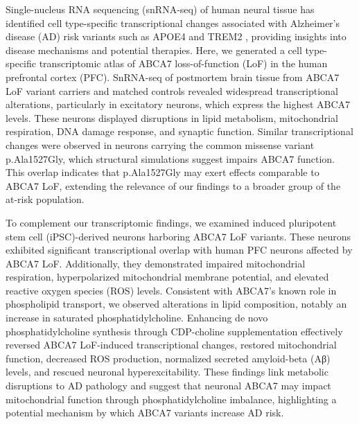 Single-nucleus RNA sequencing (snRNA-seq) of human neural tissue has identified cell type-specific transcriptional changes associated with Alzheimer's disease (AD) risk variants such as APOE4 and TREM2 \cite{Brase2023-xk,Blanchard2022-cf,Sayed2021-qn,Wamsley2024-zm,Kamath2022-if}, providing insights into disease mechanisms and potential therapies. Here, we generated a cell type-specific transcriptomic atlas of ABCA7 loss-of-function (LoF) in the human prefrontal cortex (PFC). SnRNA-seq of postmortem brain tissue from ABCA7 LoF variant carriers and matched controls revealed widespread transcriptional alterations, particularly in excitatory neurons, which express the highest ABCA7 levels. These neurons displayed disruptions in lipid metabolism, mitochondrial respiration, DNA damage response, and synaptic function. Similar transcriptional changes were observed in neurons carrying the common missense variant p.Ala1527Gly, which structural simulations suggest impairs ABCA7 function. This overlap indicates that p.Ala1527Gly may exert effects comparable to ABCA7 LoF, extending the relevance of our findings to a broader group of the at-risk population.

To complement our transcriptomic findings, we examined induced pluripotent stem cell (iPSC)-derived neurons harboring ABCA7 LoF variants. These neurons exhibited significant transcriptional overlap with human PFC neurons affected by ABCA7 LoF. Additionally, they demonstrated impaired mitochondrial respiration, hyperpolarized mitochondrial membrane potential, and elevated reactive oxygen species (ROS) levels. Consistent with ABCA7's known role in phospholipid transport, we observed alterations in lipid composition, notably an increase in saturated phosphatidylcholine. Enhancing de novo phosphatidylcholine synthesis through CDP-choline supplementation effectively reversed ABCA7 LoF-induced transcriptional changes, restored mitochondrial function, decreased ROS production, normalized secreted amyloid-beta (Aβ) levels, and rescued neuronal hyperexcitability. These findings link metabolic disruptions to AD pathology and suggest that neuronal ABCA7 may impact mitochondrial function through phosphatidylcholine imbalance, highlighting a potential mechanism by which ABCA7 variants increase AD risk.


